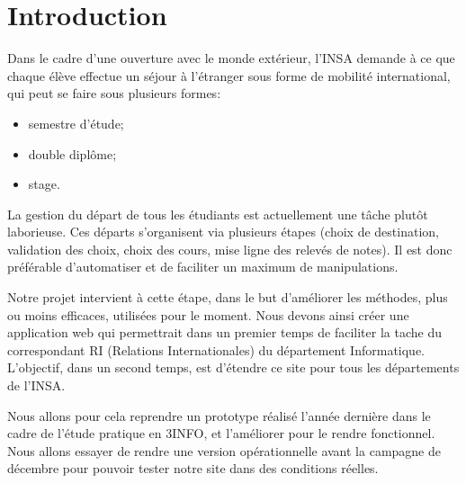 \chapter*{Introduction}
Dans le cadre d'une ouverture avec le monde extérieur, l'INSA demande à ce que chaque élève effectue un séjour à l'étranger sous forme de mobilité international, qui peut se faire sous plusieurs formes:
\begin{itemize}
\item semestre d'étude;
\item double diplôme;
\item stage.
\end{itemize}

La gestion du départ de tous les étudiants est actuellement une tâche plutôt laborieuse.
Ces départs s'organisent via plusieurs étapes (choix de destination, validation des choix, choix des cours, mise ligne des relevés de notes). Il est donc préférable d'automatiser et de faciliter un maximum de manipulations.

Notre projet intervient à cette étape, dans le but d'améliorer les méthodes, plus ou moins efficaces, utilisées pour le moment. Nous devons ainsi créer une application web qui permettrait dans un premier temps de faciliter la tache du correspondant RI (Relations Internationales) du département Informatique. L'objectif, dans un second temps, est d'étendre ce site pour tous les départements de l'INSA.

Nous allons pour cela reprendre un prototype réalisé l'année dernière dans le cadre de l'étude pratique en 3INFO, et l'améliorer pour le rendre fonctionnel.
Nous allons essayer de rendre une version opérationnelle avant la campagne  de décembre pour pouvoir tester notre site dans des conditions réelles.

